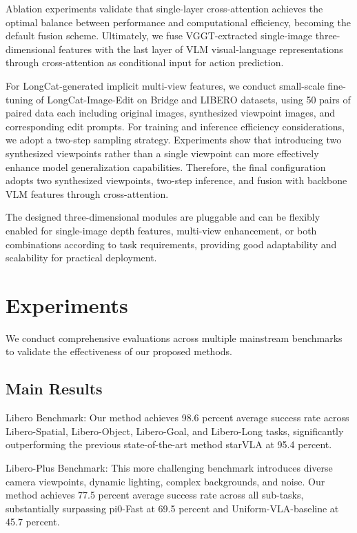 \documentclass[11pt,a4paper]{article}
\begin{document}
Ablation experiments validate that single-layer cross-attention achieves the optimal balance between performance and computational efficiency, becoming the default fusion scheme. Ultimately, we fuse VGGT-extracted single-image three-dimensional features with the last layer of VLM visual-language representations through cross-attention as conditional input for action prediction.

For LongCat-generated implicit multi-view features, we conduct small-scale fine-tuning of LongCat-Image-Edit on Bridge and LIBERO datasets, using 50 pairs of paired data each including original images, synthesized viewpoint images, and corresponding edit prompts. For training and inference efficiency considerations, we adopt a two-step sampling strategy. Experiments show that introducing two synthesized viewpoints rather than a single viewpoint can more effectively enhance model generalization capabilities. Therefore, the final configuration adopts two synthesized viewpoints, two-step inference, and fusion with backbone VLM features through cross-attention.

The designed three-dimensional modules are pluggable and can be flexibly enabled for single-image depth features, multi-view enhancement, or both combinations according to task requirements, providing good adaptability and scalability for practical deployment.

\section{Experiments}

We conduct comprehensive evaluations across multiple mainstream benchmarks to validate the effectiveness of our proposed methods.

\subsection{Main Results}

Libero Benchmark: Our method achieves 98.6 percent average success rate across Libero-Spatial, Libero-Object, Libero-Goal, and Libero-Long tasks, significantly outperforming the previous state-of-the-art method starVLA at 95.4 percent.

Libero-Plus Benchmark: This more challenging benchmark introduces diverse camera viewpoints, dynamic lighting, complex backgrounds, and noise. Our method achieves 77.5 percent average success rate across all sub-tasks, substantially surpassing pi0-Fast at 69.5 percent and Uniform-VLA-baseline at 45.7 percent.
\end{document}
